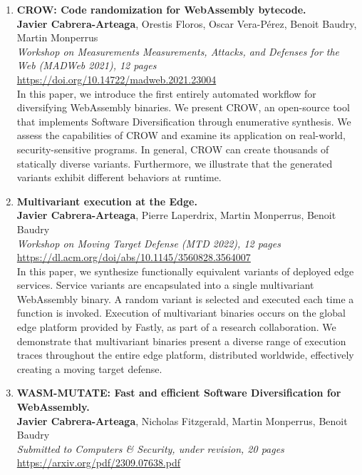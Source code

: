 \begin{enumerate}[label={\textbf{\Roman*}:}, ref={\Roman*}]
	\item \label{crowpaper} \textbf{CROW: Code randomization for WebAssembly bytecode.} \\ 
	\textbf{Javier Cabrera-Arteaga}, Orestis Floros, Oscar Vera-Pérez, Benoit Baudry, Martin Monperrus\\
	\textit{ Workshop on Measurements Measurements, Attacks, and Defenses for the Web (MADWeb 2021), 12 pages} \\
	\url{https://doi.org/10.14722/madweb.2021.23004} \\
	
	 In this paper, we introduce the first entirely automated workflow for diversifying WebAssembly binaries. 
	We present CROW, an open-source tool that implements Software Diversification through enumerative synthesis. 
	We assess the capabilities of CROW and examine its application on real-world, security-sensitive programs.
	In general, CROW can create thousands of statically diverse variants. 
	Furthermore, we illustrate that the generated variants exhibit different behaviors at runtime.

	
	
	\item \label{mewepaper} \textbf{Multivariant execution at the Edge. } \\
	\textbf{Javier Cabrera-Arteaga}, Pierre Laperdrix, Martin Monperrus, Benoit Baudry\\
    \textit{Workshop on Moving Target Defense (MTD 2022), 12 pages} \\
    \url{https://dl.acm.org/doi/abs/10.1145/3560828.3564007} \\

	In this paper, we synthesize functionally equivalent variants of deployed edge services. 
	Service variants are encapsulated into a single multivariant WebAssembly binary. 
	A random variant is selected and executed each time a function is invoked.
	Execution of multivariant binaries occurs on the global edge platform provided by Fastly, as part of a research collaboration. 
	We demonstrate that multivariant binaries present a diverse range of execution traces throughout the entire edge platform, distributed worldwide, effectively creating a moving target defense.

	
	\item \label{wasmmutatepaper}\textbf{WASM-MUTATE: Fast and efficient Software Diversification for WebAssembly. }\\ 
	\textbf{Javier Cabrera-Arteaga}, Nicholas Fitzgerald, Martin Monperrus, Benoit Baudry\\
	\textit{Submitted to Computers \& Security, under revision, 20 pages} \\
	\url{https://arxiv.org/pdf/2309.07638.pdf}


\end{enumerate}
